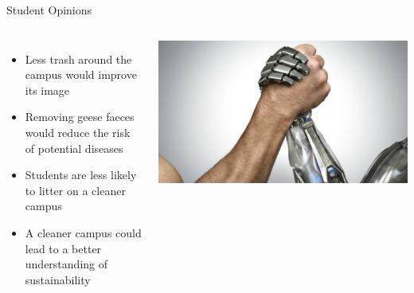 \documentclass[18pt]{beamer}
\begin{document}
    \begin{frame}{Student Opinions}
        \begin{columns}
            \begin{itemize}
                \item Less trash around the campus would improve its image \pause
                \item Removing geese faeces would reduce the risk of potential diseases \pause
                \item Students are less likely to litter on a cleaner campus \pause
                \item A cleaner campus could lead to a better understanding of sustainability
            \end{itemize}
            \includegraphics[width=0.99\columnwidth]{humanvsrobot}
        \end{columns}
    \end{frame}
\end{document}
